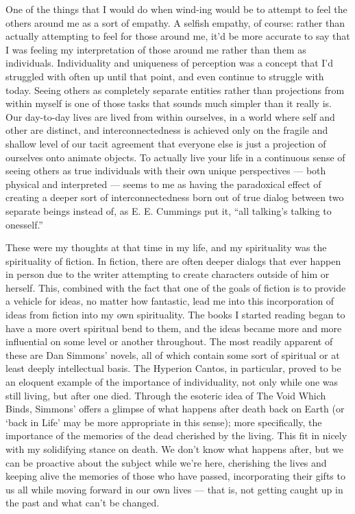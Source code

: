 \documentclass{book}
\begin{document}
One of the things that I would do when wind-ing would be to attempt to feel the others around me as a sort of empathy.  A selfish empathy, of course: rather than actually attempting to feel for those around me, it'd be more accurate to say that I was feeling my interpretation of those around me rather than them as individuals.  Individuality and uniqueness of perception was a concept that I'd struggled with often up until that point, and even continue to struggle with today.  Seeing others as completely separate entities rather than projections from within myself is one of those tasks that sounds much simpler than it really is.  Our day-to-day lives are lived from within ourselves, in a world where self and other are distinct, and interconnectedness is achieved only on the fragile and shallow level of our tacit agreement that everyone else is just a projection of ourselves onto animate objects.  To actually live your life in a continuous sense of seeing others as true individuals with their own unique perspectives --- both physical and interpreted --- seems to me as having the paradoxical effect of creating a deeper sort of interconnectedness born out of true dialog between two separate beings instead of, as E.  E.  Cummings put it, ``all talking's talking to onesself.''

These were my thoughts at that time in my life, and my spirituality was the spirituality of fiction.  In fiction, there are often deeper dialogs that ever happen in person due to the writer attempting to create characters outside of him or herself.  This, combined with the fact that one of the goals of fiction is to provide a vehicle for ideas, no matter how fantastic, lead me into this incorporation of ideas from fiction into my own spirituality.  The books I started reading began to have a more overt spiritual bend to them, and the ideas became more and more influential on some level or another throughout.  The most readily apparent of these are Dan Simmons' novels, all of which contain some sort of spiritual or at least deeply intellectual basis.  The Hyperion Cantos, in particular, proved to be an eloquent example of the importance of individuality, not only while one was still living, but after one died.  Through the esoteric idea of The Void Which Binds, Simmons' offers a glimpse of what happens after death back on Earth (or `back in Life' may be more appropriate in this sense); more specifically, the importance of the memories of the dead cherished by the living.  This fit in nicely with my solidifying stance on death.  We don't know what happens after, but we can be proactive about the subject while we're here, cherishing the lives and keeping alive the memories of those who have passed, incorporating their gifts to us all while moving forward in our own lives --- that is, not getting caught up in the past and what can't be changed.
\end{document}
